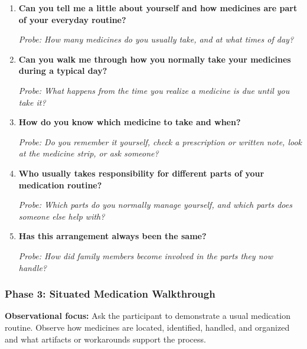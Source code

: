 \begin{enumerate}
  \item \textbf{Can you tell me a little about yourself and how medicines are part of your everyday routine?}

  \textit{Probe: How many medicines do you usually take, and at what times of day?}
  \item \textbf{Can you walk me through how you normally take your medicines during a typical day?}

  \textit{Probe: What happens from the time you realize a medicine is due until you take it?}
  \item \textbf{How do you know which medicine to take and when?}

  \textit{Probe: Do you remember it yourself, check a prescription or written note, look at the medicine strip, or ask someone?}
  \item \textbf{Who usually takes responsibility for different parts of your medication routine?}

  \textit{Probe: Which parts do you normally manage yourself, and which parts does someone else help with?}
  \item \textbf{Has this arrangement always been the same?}

  \textit{Probe: How did family members become involved in the parts they now handle?}
\end{enumerate}

\subsubsection{Phase 3: Situated Medication Walkthrough}

\textbf{Observational focus:} Ask the participant to demonstrate a usual medication routine. Observe how medicines are located, identified, handled, and organized and what artifacts or workarounds support the process.

